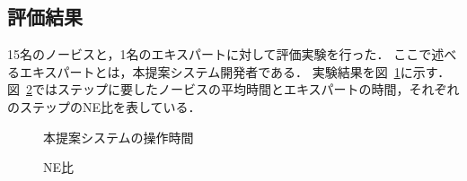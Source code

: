 \documentclass[sotsuron]{kuee}
\begin{document}
		\subsection{評価結果}
			15名のノービスと，1名のエキスパートに対して評価実験を行った．
			ここで述べるエキスパートとは，本提案システム開発者である．
			実験結果を図~\ref{fig:result01}に示す．
			図~\ref{fig:result02}ではステップに要したノービスの平均時間とエキスパートの時間，それぞれのステップのNE比を表している．
			\begin{figure}
				\begin{center}
				\end{center}
				\caption{本提案システムの操作時間}
		  		\label{fig:result01}
			\end{figure}
			\begin{figure}
				\begin{center}
				\end{center}
				\caption{NE比}
		  		\label{fig:result02}
			\end{figure}
\end{document}
